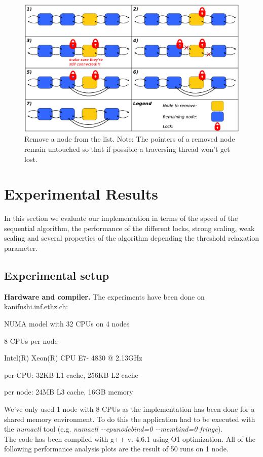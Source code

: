 \documentclass[letterpaper]{article}
\newcommand{\mypar}[1]{{\bf #1.}}
\begin{document}
\begin{figure}[h]\centering
  \includegraphics[scale=0.31]{remove.eps}
  \caption{Remove a node from the list. Note: The pointers of a removed node remain untouched so that if possible a traversing thread won't get lost. \label{fig:remove}}
\end{figure}



\section{Experimental Results}\label{sec:exp}

In this section we evaluate our implementation in terms of the speed of the sequential algorithm, the performance of the different locks, strong scaling, weak scaling and several properties of the algorithm depending the threshold relaxation parameter.

\subsection{Experimental setup}\label{ssec:setup}

\mypar{Hardware and compiler}
The experiments have been done on kanifushi.inf.ethz.ch:
\begin{compactitem}
\item NUMA model with 32 CPUs on 4 nodes
\item 8 CPUs per node
\item Intel(R) Xeon(R) CPU E7- 4830 @ 2.13GHz
\item per CPU: 32KB L1 cache, 256KB L2 cache
\item per node: 24MB L3 cache, 16GB memory
\end{compactitem}
We've only used 1 node with 8 CPUs as the implementation has been done for a shared memory environment. To do this the application had to be executed with the \textit{numactl} tool (e.g. \textit{numactl -{}-cpunodebind=0 -{}-membind=0 fringe}).\\
The code has been compiled with g++ v. 4.6.1 using O1 optimization. All of the following performance analysis plots are the result of 50 runs on 1 node.
\end{document}
